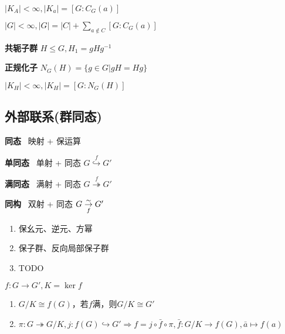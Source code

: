 \documentclass[a4paper,10pt]{ctexart}
\newcommand*{\impl}{\Rightarrow}
\renewcommand*{\leq}{\leqslant}
\begin{document}
\begin{multicols}{3}
    \begin{theorem}[共轭类]
        $|K_A| < \infty, |K_a| = [G:C_G(a)]$
    \end{theorem}

    \begin{theorem}[类方程]
        $|G| \! < \! \infty, |G| \! = \! |C| + \sum\limits_{a \notin C} [G:C_G(a)]$
    \end{theorem}

    \textbf{共轭子群} $H \leq G, H_1 = gHg^{-1}$

    \textbf{正规化子} $N_G(H) = \{g \in G | gH = Hg\}$

    \begin{theorem}[共轭子群类]
        $|K_H| \!\! < \!\! \infty, |K_H| \!\! = \!\! [G:N_G(H)]$
    \end{theorem}

    \subsection{外部联系(群同态)}

    \textbf{同态} \ 映射 + 保运算

    \textbf{单同态} \ 单射 + 同态 $G \overset{f}{\hookrightarrow} G'$

    \textbf{满同态} \ 满射 + 同态 $G \overset{f}{\twoheadrightarrow} G'$

    \textbf{同构} \ 双射 + 同态 $G \overunderset{\sim}{f}{\rightarrow} G'$

    \begin{theorem}[同态性质]
        \hfil

        \begin{enumerate}
            \item 保幺元、逆元、方幂
            \item 保子群、反向局部保子群

            \item TODO
        \end{enumerate}
    \end{theorem}

    \begin{theorem}[同态基本定理]
        $f: G \rightarrow G', K = \ker f$

        \begin{enumerate}
            \item $G/K \cong f(G)$，若$f$满，则$G/K \cong G'$
            \item $\pi: G \twoheadrightarrow G/K, j: f(G) \hookrightarrow G' \impl f = j \circ \bar{f} \circ \pi, \bar{f}: G/K \rightarrow f(G), \bar{a} \mapsto f(a)$
        \end{enumerate}
    \end{theorem}


\end{multicols}
\end{document}
